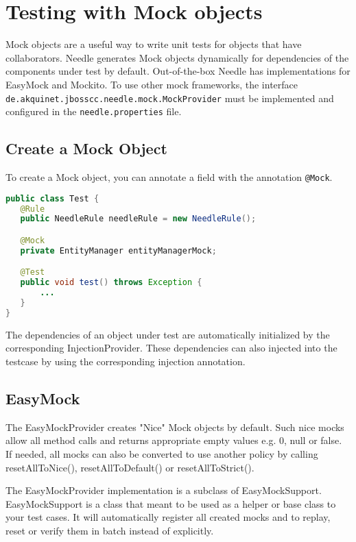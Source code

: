 \chapter{Testing with Mock objects}
Mock objects are a useful way to write unit tests for objects that have collaborators. 
Needle generates Mock objects dynamically for dependencies of the components under test by default.
Out-of-the-box Needle has implementations for EasyMock and Mockito.
To use other mock frameworks, the interface \verb|de.akquinet.jbosscc.needle.mock.MockProvider| must be implemented and configured in the \verb|needle.properties| file.

\section{Create a Mock Object}

To create a Mock object, you can annotate a field with the annotation \verb|@Mock|.

\begin{lstlisting}[language={JAVA},caption=Mock annotation]
public class Test {
   @Rule
   public NeedleRule needleRule = new NeedleRule();

   @Mock
   private EntityManager entityManagerMock;

   @Test
   public void test() throws Exception {
       ...
   }
}
\end{lstlisting}

The dependencies of an object under test are automatically initialized by the corresponding InjectionProvider.
These dependencies can also injected into the testcase by using the corresponding injection annotation.

\section{EasyMock}

The EasyMockProvider creates "Nice" Mock objects by default. Such nice mocks allow all method calls and returns appropriate empty values e.g. 0, null or false.
If needed, all mocks can also be converted to use another policy by calling resetAllToNice(), resetAllToDefault() or resetAllToStrict().

The EasyMockProvider implementation is a subclass of EasyMockSupport. EasyMockSupport is a class that meant to be used as a helper or base class to your test cases.
It will automatically register all created mocks and to replay, reset or verify them in batch instead of explicitly.


